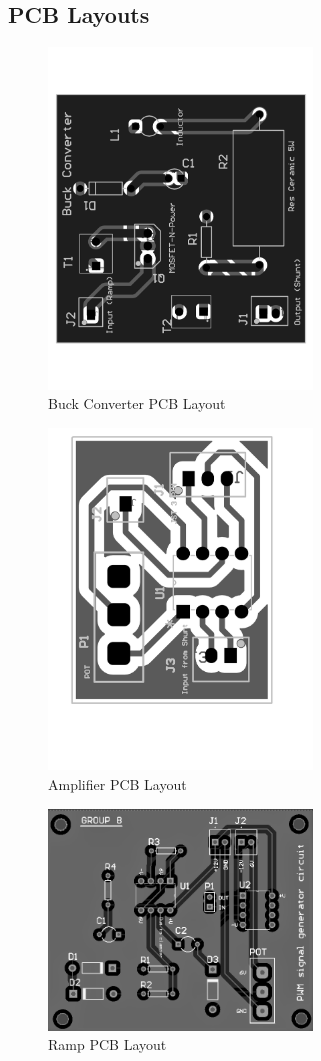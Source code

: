 \documentclass[a4paper,12pt]{article}
\begin{document}
\begin{multicols}{2}
\subsection{PCB Layouts}
\begin{figure}[H]
    \centering
    \includegraphics[width=7cm]{Fig_07-1.jpg}
    \caption{Buck Converter PCB Layout}
    \label{fig:Buck PCB}
\end{figure}
\begin{figure}[H]
    \centering
    \includegraphics[width=7cm]{Fig_08-1.jpg}
    \caption{Amplifier PCB Layout}
    \label{fig:Amp PCB}
\end{figure}
\begin{figure}[H]
    \centering
    \includegraphics[width=7cm]{ramp_pcb.png}
    \caption{Ramp PCB Layout}
    \label{fig:Ramp PCB}
\end{figure}

\end{multicols}
\end{document}
